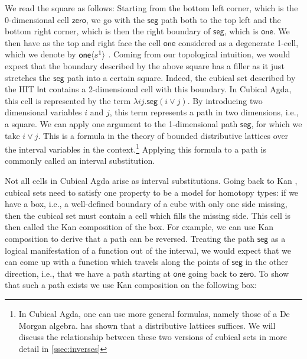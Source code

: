 \documentclass[11pt]{article}
\theoremstyle{definition}
\newcommand{\smap}[1]{s^{{#1}}}
\newcommand{\cont}[2]{\ensuremath{ \ifthenelse{\equal{#2}{}}{#1}{{#1}\langle{#2}\rangle}} }
\newcommand{\cset}[1]{\ensuremath{\mathsf{{#1}}}}
\begin{document}
We read the square as follows: Starting from the bottom left corner, which is
the 0-dimensional cell \cset{zero}, we go with the \cset{seg} path both to the
top left and the bottom right corner, which is then the right boundary of
\cset{seg}, which is \cset{one}. We then have as the top and right face 
the cell \cset{one} considered as a degenerate 1-cell, which we denote by
\cont{\cset{one}}{\smap{1}}. Coming from our topological intuition, we would
expect that the boundary described by the above square has a filler as it just
stretches the \cset{seg} path into a certain square. Indeed, the cubical set
described by the HIT \cset{Int} contains a 2-dimensional cell with
this boundary. In Cubical Agda, this cell is represented by the term
$\lambda i j .\cset{seg} (i \vee j)$. By introducing two dimensional variables
$i$ and $j$, this term represents a path
in two dimensions, i.e., a square. We can apply one argument to the
1-dimensional path
\cset{seg}, for which we take $i \vee j$. This is a formula in the theory of
bounded distributive lattices over the interval variables in the
context.\footnote{In Cubical Agda, one can use more general formulas, namely
  those of a De Morgan algebra. \cite{orton17_axiom_model_cubic_type_theor_topos} has shown
  that a distributive lattices suffices. We will discuss the
  relationship between these two versions of cubical sets in more detail in
  \autoref{ssec:inverses}}
Applying this formula to a path is commonly called an interval substitution.

Not all cells in Cubical Agda arise as interval substitutions. Going
back to Kan \cite{kan55_abstr_homot}, cubical sets need to satisfy one property
to be a model for homotopy types: if we have a box, i.e., a
well-defined boundary of a cube with only one side missing, then the cubical set
must contain a cell
which fills the missing side. This cell is then called the Kan composition of
the box. For example, we can use Kan composition to derive that a path can be reversed. 
Treating the path \cset{seg} as a logical manifestation of a function out of the
interval, we would expect that we can come up with a function which travels
along the points of \cset{seg} in the other direction, i.e., that we have a path starting at
\cset{one} going back to \cset{zero}. To show that such a path exists we use Kan
composition on the following box:

\begin{center}
\end{center}
\end{document}
